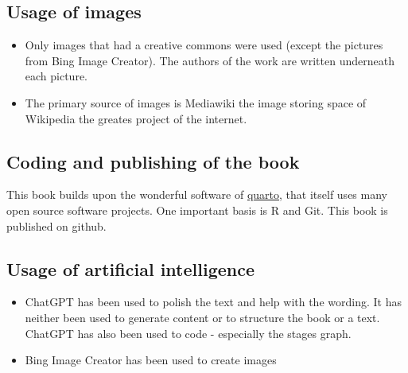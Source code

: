 \documentclass[
  letterpaper,
  DIV=11,
  numbers=noendperiod]{scrreprt}
\providecommand{\tightlist}{%
  \setlength{\itemsep}{0pt}\setlength{\parskip}{0pt}}\usepackage{longtable,booktabs,array}
\begin{document}
\subsection*{Usage of images}\label{usage-of-images}

\begin{itemize}
\tightlist
\item
  Only images that had a creative commons were used (except the pictures
  from Bing Image Creator). The authors of the work are written
  underneath each picture.
\item
  The primary source of images is Mediawiki the image storing space of
  Wikipedia the greates project of the internet.
\end{itemize}

\subsection*{Coding and publishing of the
book}\label{coding-and-publishing-of-the-book}

This book builds upon the wonderful software of
\href{quarto.org}{quarto}, that itself uses many open source software
projects. One important basis is R and Git. This book is published on
github.

\subsection*{Usage of artificial
intelligence}\label{usage-of-artificial-intelligence}

\begin{itemize}
\tightlist
\item
  ChatGPT has been used to polish the text and help with the wording. It
  has neither been used to generate content or to structure the book or
  a text. ChatGPT has also been used to code - especially the stages
  graph.
\item
  Bing Image Creator has been used to create images
\end{itemize}
\end{document}
